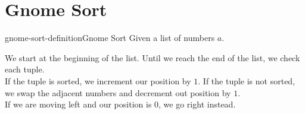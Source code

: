 \documentclass[preview]{standalone}
\begin{document}
\genpage

\section{Gnome Sort}

\begin{snippetdefinition}{gnome-sort-definition}{Gnome Sort}
    Given a list of numbers \(a\).

    We start at the beginning of the list. Until we reach the end of the list, we check each tuple. \\
    If the tuple is sorted, we increment our position by \(1\). If the tuple is not sorted, we swap the adjacent numbers and decrement out position by \(1\). \\
    If we are moving left and our position is \(0\), we go right instead.
\end{snippetdefinition}

%
\end{document}
